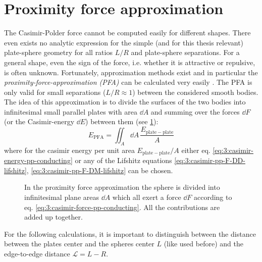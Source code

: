 \section{Proximity force approximation}\label{sec:3:pfa}

The Casimir-Polder force cannot be computed easily for different shapes. There even exists no analytic expression for the simple (and for this thesis relevant) plate-sphere geometry for all ratios $L/R$ and plate-sphere separations.
For a general shape, even the sign of the force, i.e. whether it is attractive or repulsive, is often unknown.
Fortunately, approximation methods exist and in particular the \emph{proximity-force-approximation (PFA)} can be calculated very easily \cite{Hartmann_2018,Emig_2007a,Bulgac_2006}.
The PFA is only valid for small separations ($L/R \approx 1$) between the considered smooth bodies.
The idea of this approximation is to divide the surfaces of the two bodies into infinitesimal small parallel plates with area $\dd A$ and summing over the forces $\dd F$ (or the Casimir-energy $\dd E$) between them (see \cref{fig:3:PFA}):
\begin{equation}\label{eq:3:pfa}
  E_\mathrm{PFA} = \iint_A \dd A \, \frac{E_\mathrm{plate-plate}}{A}
\end{equation}
where for the casimir energy per unit area $E_\mathrm{plate-plate}/A$ either eq. \eqref{eq:3:casimir-energy-pp-conducting} or any of the Lifshitz equations \eqref{eq:3:casimir-pp-F-DD-lifshitz}, \eqref{eq:3:casimir-pp-F-DM-lifshitz} can be chosen.
\begin{figure}[!htbp]
  \centering
  \def\svgwidth{0.55\textwidth}
  
  \caption{In the proximity force approximation the sphere is divided into infinitesimal plane areas $\dd A$ which all exert a force $\dd F$ according to eq. \eqref{eq:3:casimir-force-pp-conducting}. All the contributions are added up together.}
  \label{fig:3:PFA}
\end{figure}
For the following calculations, it is important to distinguish between the distance between the plates center and the spheres center $L$ (like used before) and the edge-to-edge distance $\mathscr{L} = L - R$.

